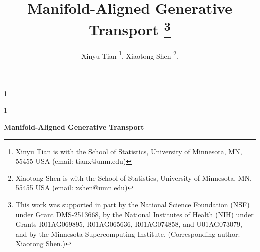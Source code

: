 \documentclass[12pt]{article}
\newcommand{\blind}{1}
\theoremstyle{definition} %
\begin{document}



\date{}


\blind
{
  \title{\bf{Manifold-Aligned Generative Transport}
\thanks{This work was supported in part by the National Science Foundation (NSF) under Grant 
DMS-2513668, by the National Institutes of Health (NIH) under Grants R01AG069895, R01AG065636, R01AG074858, and U01AG073079, and by the Minnesota Supercomputing Institute. (Corresponding author: Xiaotong Shen.) }}

\author{Xinyu Tian \thanks{Xinyu Tian is with the School of Statistics, University of Minnesota, MN, 55455 USA (email:
tianx@umn.edu)}, Xiaotong Shen \textsuperscript{} \thanks{Xiaotong Shen is with the School of Statistics, University of Minnesota, MN, 55455 USA (email: xshen@umn.edu)}.}

  \maketitle
} \fi

\blind
{
  \bigskip
  \bigskip
  \bigskip
  \begin{center}
    {\LARGE\bf Manifold-Aligned Generative Transport}
\end{center}
  \medskip
} \fi
\end{document}
